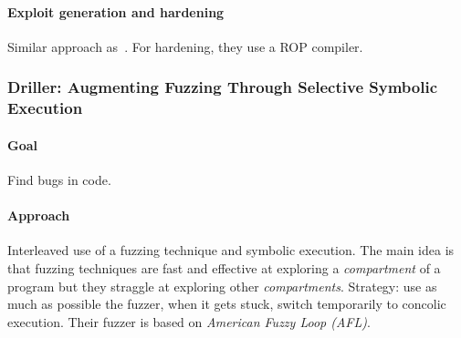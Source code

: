 \paragraph{Exploit generation and hardening} Similar approach as~\cite{AEG-NDSS11,MAYHEM-SP12}. For hardening, they use a ROP compiler.


\subsubsection{\cite{DRILLER-NDSS16} Driller: Augmenting Fuzzing Through Selective Symbolic Execution}

\paragraph{Goal} Find bugs in code.

\paragraph{Approach} Interleaved use of a fuzzing technique and symbolic execution. The main idea is that fuzzing techniques are fast and effective at exploring a {\em compartment} of a program but they straggle at exploring other {\em compartments}. Strategy: use as much as possible the fuzzer, when it gets stuck, switch temporarily to concolic execution. Their fuzzer is based on {\em American Fuzzy Loop (AFL)}.


\begin{comment}

\subsubsection{\cite{}} 

\paragraph{Goal}
\paragraph{Approach}

\begin{itemize}
  \item test
\end{itemize}

\begin{enumerate}
  \item test
\end{enumerate}

\begin{lstlisting}
\end{lstlisting}

\end{comment}

